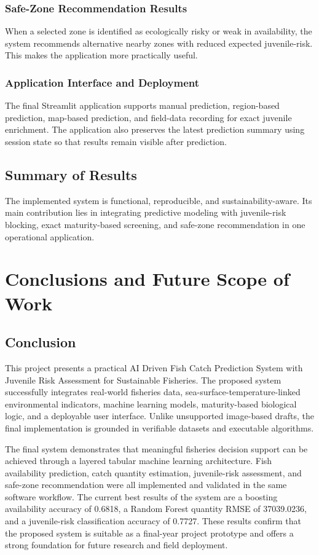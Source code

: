 \documentclass[12pt,a4paper]{report}
\begin{document}
\subsection{Safe-Zone Recommendation Results}
When a selected zone is identified as ecologically risky or weak in availability, the system recommends alternative nearby zones with reduced expected juvenile-risk. This makes the application more practically useful.

\subsection{Application Interface and Deployment}
The final Streamlit application supports manual prediction, region-based prediction, map-based prediction, and field-data recording for exact juvenile enrichment. The application also preserves the latest prediction summary using session state so that results remain visible after prediction.

\section{Summary of Results}
The implemented system is functional, reproducible, and sustainability-aware. Its main contribution lies in integrating predictive modeling with juvenile-risk blocking, exact maturity-based screening, and safe-zone recommendation in one operational application.

\chapter{Conclusions and Future Scope of Work}

\section{Conclusion}
This project presents a practical AI Driven Fish Catch Prediction System with Juvenile Risk Assessment for Sustainable Fisheries. The proposed system successfully integrates real-world fisheries data, sea-surface-temperature-linked environmental indicators, machine learning models, maturity-based biological logic, and a deployable user interface. Unlike unsupported image-based drafts, the final implementation is grounded in verifiable datasets and executable algorithms.

The final system demonstrates that meaningful fisheries decision support can be achieved through a layered tabular machine learning architecture. Fish availability prediction, catch quantity estimation, juvenile-risk assessment, and safe-zone recommendation were all implemented and validated in the same software workflow. The current best results of the system are a boosting availability accuracy of 0.6818, a Random Forest quantity RMSE of 37039.0236, and a juvenile-risk classification accuracy of 0.7727. These results confirm that the proposed system is suitable as a final-year project prototype and offers a strong foundation for future research and field deployment.
\end{document}
